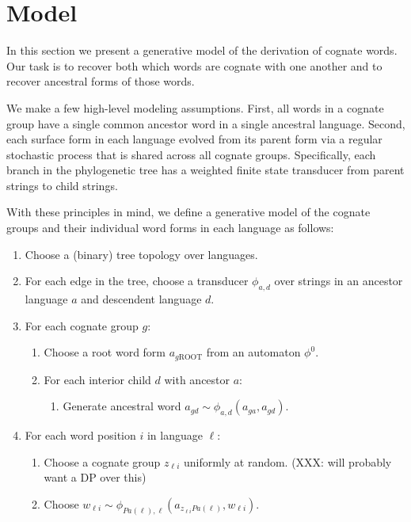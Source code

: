 \documentclass[11pt]{article}
\begin{document}
\section{Model}

In this section we present a generative model of the derivation of
cognate words. Our task is to recover both which words are cognate
with one another and to recover ancestral forms of those words.

We make a few high-level modeling assumptions. First, all words in
a cognate group have a single common ancestor word in a single
ancestral language. Second, each surface form in each language
evolved from its parent form via a regular stochastic process that
is shared across all cognate groups. Specifically, each branch in
the phylogenetic tree has a weighted finite state transducer from
parent strings to child strings.

With these principles in mind, we define a generative model of the cognate groups and their individual word forms in each language as follows:
\begin{enumerate}
  \item Choose a (binary) tree topology over languages.
  \item For each edge in the tree, choose a transducer $\phi_{a,d}$ over strings in an ancestor language $a$ and descendent language $d$.
  \item For each cognate group $g$:
    \begin{enumerate}
      \item Choose a root word form $a_{g\mathrm{ROOT}}$ from an automaton $\phi^0$.
      \item For each interior child $d$ with ancestor $a$:
        \begin{enumerate}
          \item Generate ancestral word $a_{gd} \sim \phi_{a,d}(a_{ga},a_{gd})$.
        \end{enumerate}
    \end{enumerate}
  \item For each word position $i$ in language $\ell$:
    \begin{enumerate}
      \item Choose a cognate group $z_{\ell i}$ uniformly at random. (XXX: will probably want a DP over this)
      \item Choose $w_{\ell i} \sim \phi_{Pa(\ell),\ell}(a_{z_{\ell i}Pa(\ell)},w_{\ell i})$.
    \end{enumerate}
\end{enumerate}
\end{document}
